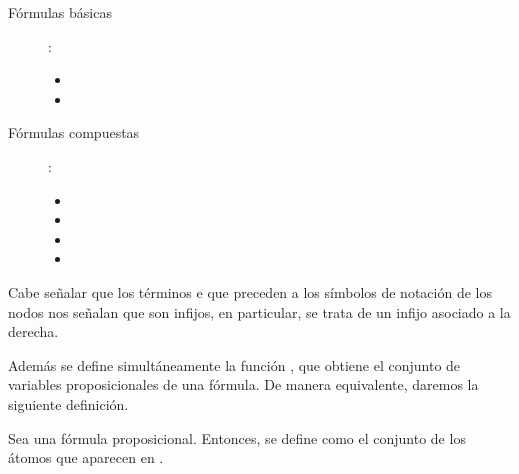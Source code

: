 \begin{isabellebody}
\begin{isamarkuptext}
  \begin{description}
    \item[Fórmulas básicas]:  
      \begin{itemize}
        \item {}
        \item {}
      \end{itemize}
    \item [Fórmulas compuestas]:
      \begin{itemize}
        \item {}
        \item {}
        \item {}
        \item {}
      \end{itemize}
  \end{description}

  Cabe señalar que los términos  e  que preceden a los
  símbolos de notación de los nodos nos señalan que son infijos, en 
  particular,  se trata de un infijo asociado a la derecha.

  Además se define simultáneamente la función , que 
  obtiene el conjunto de variables proposicionales de una fórmula. De 
  manera equivalente, daremos la siguiente definición.

  \begin{definicion}
    Sea  una fórmula proposicional. Entonces, se define 
     como el conjunto de los átomos que aparecen en .
  \end{definicion}


\end{isamarkuptext}
\end{isabellebody}
